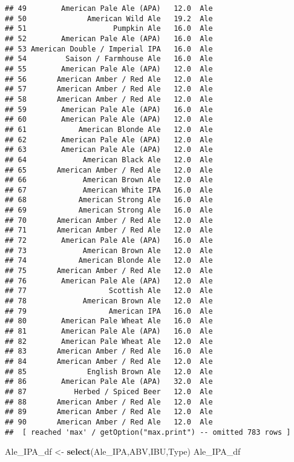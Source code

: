 \documentclass[
]{article}
\newenvironment{Shaded}{\begin{snugshade}}{\end{snugshade}}
\newcommand{\KeywordTok}[1]{\textcolor[rgb]{0.13,0.29,0.53}{\textbf{#1}}}
\newcommand{\NormalTok}[1]{#1}
\newcommand{\StringTok}[1]{\textcolor[rgb]{0.31,0.60,0.02}{#1}}
\begin{document}
\begin{verbatim}
## 49        American Pale Ale (APA)   12.0  Ale
## 50              American Wild Ale   19.2  Ale
## 51                    Pumpkin Ale   16.0  Ale
## 52        American Pale Ale (APA)   16.0  Ale
## 53 American Double / Imperial IPA   16.0  Ale
## 54         Saison / Farmhouse Ale   16.0  Ale
## 55        American Pale Ale (APA)   12.0  Ale
## 56       American Amber / Red Ale   12.0  Ale
## 57       American Amber / Red Ale   12.0  Ale
## 58       American Amber / Red Ale   12.0  Ale
## 59        American Pale Ale (APA)   16.0  Ale
## 60        American Pale Ale (APA)   12.0  Ale
## 61            American Blonde Ale   12.0  Ale
## 62        American Pale Ale (APA)   12.0  Ale
## 63        American Pale Ale (APA)   12.0  Ale
## 64             American Black Ale   12.0  Ale
## 65       American Amber / Red Ale   12.0  Ale
## 66             American Brown Ale   12.0  Ale
## 67             American White IPA   16.0  Ale
## 68            American Strong Ale   16.0  Ale
## 69            American Strong Ale   16.0  Ale
## 70       American Amber / Red Ale   12.0  Ale
## 71       American Amber / Red Ale   12.0  Ale
## 72        American Pale Ale (APA)   16.0  Ale
## 73             American Brown Ale   12.0  Ale
## 74            American Blonde Ale   12.0  Ale
## 75       American Amber / Red Ale   12.0  Ale
## 76        American Pale Ale (APA)   12.0  Ale
## 77                   Scottish Ale   12.0  Ale
## 78             American Brown Ale   12.0  Ale
## 79                   American IPA   16.0  Ale
## 80        American Pale Wheat Ale   16.0  Ale
## 81        American Pale Ale (APA)   16.0  Ale
## 82        American Pale Wheat Ale   12.0  Ale
## 83       American Amber / Red Ale   16.0  Ale
## 84       American Amber / Red Ale   12.0  Ale
## 85              English Brown Ale   12.0  Ale
## 86        American Pale Ale (APA)   32.0  Ale
## 87           Herbed / Spiced Beer   12.0  Ale
## 88       American Amber / Red Ale   12.0  Ale
## 89       American Amber / Red Ale   12.0  Ale
## 90       American Amber / Red Ale   12.0  Ale
##  [ reached 'max' / getOption("max.print") -- omitted 783 rows ]
\end{verbatim}

\begin{Shaded}
\begin{Highlighting}[]
\NormalTok{Ale_IPA_df <-}\StringTok{ }\KeywordTok{select}\NormalTok{(Ale_IPA,ABV,IBU,Type)}
\NormalTok{Ale_IPA_df}
\end{Highlighting}
\end{Shaded}
\end{document}
